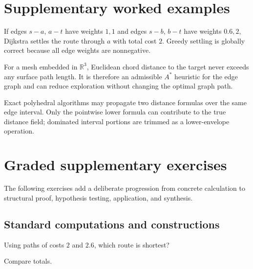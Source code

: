 \section{Supplementary worked examples}
\label{sec:vii39-pedagogy}

\begin{example}\label{ex:vii39-ped-01}
If edges \(s\! - a\), \(a\! - t\) have weights \(1,1\) and edges \(s\! - b\), \(b\! - t\) have weights \(0.6,2\), Dijkstra settles the route through \(a\) with total cost \(2\).  Greedy settling is globally correct because all edge weights are nonnegative.
\end{example}

\begin{example}\label{ex:vii39-ped-02}
For a mesh embedded in \(\mathbb R^3\), Euclidean chord distance to the target never exceeds any surface path length.  It is therefore an admissible \(A^*\) heuristic for the edge graph and can reduce exploration without changing the optimal graph path.
\end{example}

\begin{example}\label{ex:vii39-ped-03}
Exact polyhedral algorithms may propagate two distance formulas over the same edge interval.  Only the pointwise lower formula can contribute to the true distance field; dominated interval portions are trimmed as a lower-envelope operation.
\end{example}

\section{Graded supplementary exercises}
The following exercises add a deliberate progression from concrete calculation to structural proof, hypothesis testing, application, and synthesis.

\subsection*{Standard computations and constructions}

\begin{exercise}\label{exr:vii39-ped-01}
Using paths of costs \(2\) and \(2.6\), which route is shortest?
\end{exercise}

\begin{hint}
Compare totals.
\end{hint}

